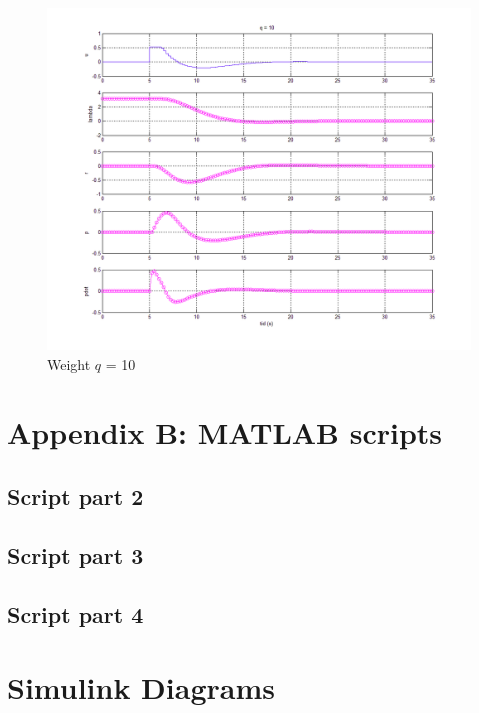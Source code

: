 \documentclass[a4paper, 12pt]{article}\usepackage[utf8]{inputenc}
\begin{document}
\begin{figure}[H]
    \centering
    \includegraphics[width=150mm]{Part2/q_lik_10.png}
    \caption{Weight $q$ = 10}
    \label{fig:plot_2.3_3}
\end{figure}



\section{Appendix B: MATLAB scripts}

\subsection{Script part 2}


\subsection{Script part 3}


\subsection{Script part 4} \label{script:4}


\section{Simulink Diagrams}
\end{document}
